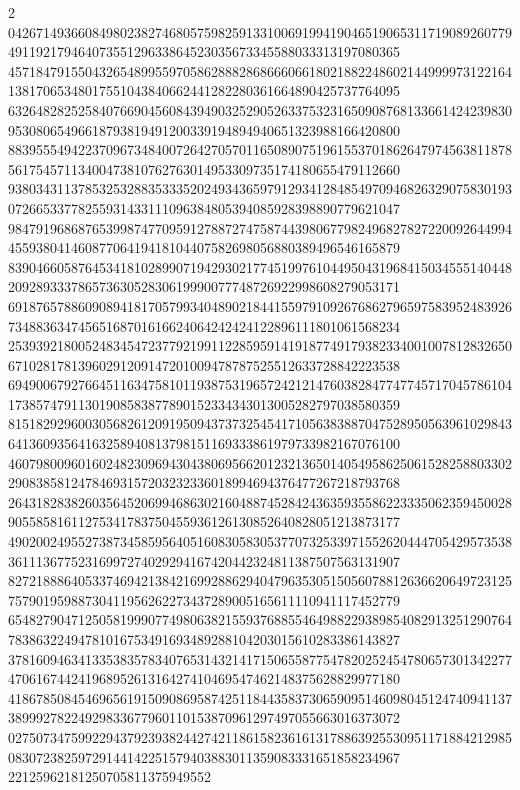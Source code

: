 \documentclass[10pt,
b5paper,
fleqn,
dvipdfmx,
uplatex
]{jsarticle}
\begin{document}
2\\04267149366084980238274680575982591331006919941904651906531171908926077949119217946407355129633864523035673345588033313197080365\\45718479155043265489955970586288828686660661802188224860214499997312216413817065348017551043840662441282280361664890425737764095\\63264828252584076690456084394903252905263375323165090876813366142423983095308065496618793819491200339194894940651323988166420800\\88395554942237096734840072642705701165089075196155370186264797456381187856175457113400473810762763014953309735174180655479112660\\93803431137853253288353335202493436597912934128485497094682632907583019307266533778255931433111096384805394085928398890779621047\\98479196868765399874770959127887274758744398067798249682782722009264499445593804146087706419418104407582698056880389496546165879\\83904660587645341810289907194293021774519976104495043196841503455514044820928933378657363052830619990077748726922998608279053171\\69187657886090894181705799340489021844155979109267686279659758395248392673488363474565168701616624064242424122896111801061568234\\25393921800524834547237792199112285959141918774917938233400100781283265067102817813960291209147201009478787525512633728842223538\\69490067927664511634758101193875319657242121476038284774774571704578610417385747911301908583877890152334343013005282797038580359\\81518292960030568261209195094373732545417105638388704752895056396102984364136093564163258940813798151169333861979733982167076100\\46079800960160248230969430438069566201232136501405495862506152825880330229083858124784693157203232336018994694376477267218793768\\26431828382603564520699468630216048874528424363593558622333506235945002890558581611275341783750455936126130852640828051213873177\\49020024955273873458595640516083058305377073253397155262044470542957353836111367752316997274029294167420442324811387507563131907\\82721888640533746942138421699288629404796353051505607881263662064972312575790195988730411956262273437289005165611110941117452779\\65482790471250581999077498063821559376885546498822938985408291325129076478386322494781016753491693489288104203015610283386143827\\37816094634133538357834076531432141715065587754782025245478065730134227747061674424196895261316427410469547462148375628829977180\\41867850845469656191509086958742511844358373065909514609804512474094113738999278224929833677960110153870961297497055663016373072\\02750734759922943792393824427421186158236161317886392553095117188421298508307238259729144142251579403883011359083331651858234967\\22125962181250705811375949552
\end{document}

